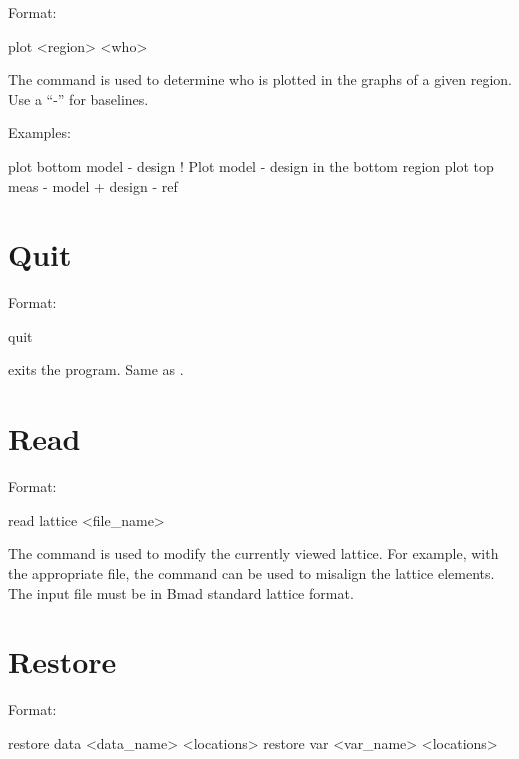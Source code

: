 Format:
\begin{example}
  plot <region> <who>
\end{example}

\vskip 0.2in 
The  command is used to determine who is plotted
in the graphs of a given region. Use a ``-'' for baselines. 

Examples:
\begin{example}
  plot bottom model - design       ! Plot model - design in the bottom region
  plot top meas - model + design - ref 
\end{example}

\section{Quit}
\label{s:quit}

Format:
\begin{example}
  quit
\end{example}

\vskip 0.2in
 exits the program. Same as .

\section{Read}
\label{s:read}

Format:
\begin{example}
  read lattice <file_name>
\end{example}

\vskip 0.2in 
The  command is used to modify the currently
viewed  lattice. For example, with the appropriate file,
the  command can be used to misalign the lattice
elements. The input file must be in Bmad standard lattice format.

\section{Restore}
\label{s:restore}

Format:
\begin{example}
  restore data  <data_name> <locations>
  restore var <var_name> <locations>
\end{example}

